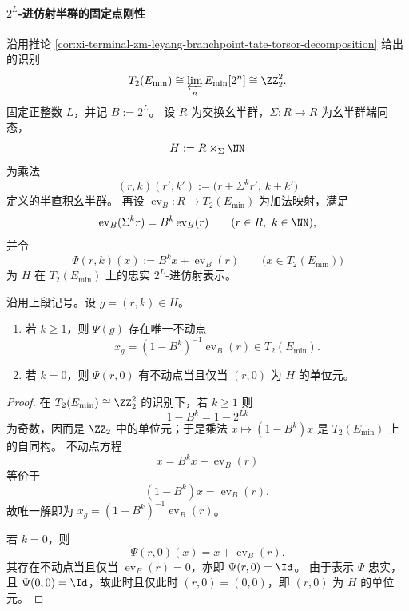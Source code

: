 \paragraph{\texorpdfstring{$2^L$}{2^L}-进仿射半群的固定点刚性}
沿用推论 \ref{cor:xi-terminal-zm-leyang-branchpoint-tate-torsor-decomposition} 给出的识别
\[
T_2(E_{\min})\cong \varprojlim_n E_{\min}[2^n]\cong \ZZ_2^2.
\]
固定正整数 \(L\)，并记 \(B:=2^L\)。
设 \(R\) 为交换幺半群，\(\Sigma:R\to R\) 为幺半群端同态，
\[
H:=R\rtimes_{\Sigma}\NN
\]
为乘法
\[
(r,k)(r',k'):=\bigl(r+\Sigma^k r',\,k+k'\bigr)
\]
定义的半直积幺半群。
再设 \(\operatorname{ev}_B:R\to T_2(E_{\min})\) 为加法映射，满足
\[
\operatorname{ev}_B(\Sigma^k r)=B^k\operatorname{ev}_B(r)
\qquad (r\in R,\ k\in\NN),
\]
并令
\[
\Psi(r,k)(x):=B^k x+\operatorname{ev}_B(r)
\qquad \bigl(x\in T_2(E_{\min})\bigr)
\]
为 \(H\) 在 \(T_2(E_{\min})\) 上的忠实 \(2^L\)-进仿射表示。

\begin{theorem}\label{thm:xi-time-part9g-affine-semigroup-unique-fixed-point}
沿用上段记号。设 \(g=(r,k)\in H\)。
\begin{enumerate}
  \item 若 \(k\ge 1\)，则 \(\Psi(g)\) 存在唯一不动点
  \[
  x_g=(1-B^k)^{-1}\operatorname{ev}_B(r)\in T_2(E_{\min}).
  \]
  \item 若 \(k=0\)，则 \(\Psi(r,0)\) 有不动点当且仅当 \((r,0)\) 为 \(H\) 的单位元。
\end{enumerate}
\end{theorem}
\begin{proof}
在 \(T_2(E_{\min})\cong \ZZ_2^2\) 的识别下，若 \(k\ge 1\) 则
\[
1-B^k=1-2^{Lk}
\]
为奇数，因而是 \(\ZZ_2\) 中的单位元；于是乘法
\(
x\mapsto (1-B^k)x
\)
是 \(T_2(E_{\min})\) 上的自同构。
不动点方程
\[
x=B^k x+\operatorname{ev}_B(r)
\]
等价于
\[
(1-B^k)x=\operatorname{ev}_B(r),
\]
故唯一解即为
\(
x_g=(1-B^k)^{-1}\operatorname{ev}_B(r)
\)。

若 \(k=0\)，则
\[
\Psi(r,0)(x)=x+\operatorname{ev}_B(r).
\]
其存在不动点当且仅当 \(\operatorname{ev}_B(r)=0\)，亦即 \(\Psi(r,0)=\Id\)。
由于表示 \(\Psi\) 忠实，且 \(\Psi(0,0)=\Id\)，故此时且仅此时 \((r,0)=(0,0)\)，即 \((r,0)\) 为 \(H\) 的单位元。
\end{proof}

